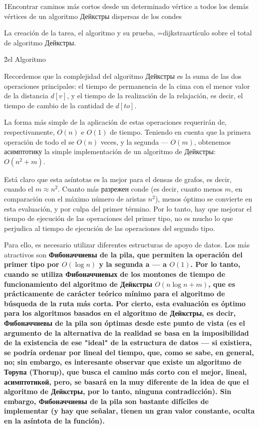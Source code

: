 \h1{Encontrar caminos más cortos desde un determinado vértice a todos los demás vértices de un algoritmo Дейкстры dispersas de los condes}

La creación de la tarea, el algoritmo y su prueba, \algohref=dijkstra{artículo sobre el total de algoritmo Дейкстры}.

\h2{el Algoritmo}

Recordemos que la complejidad del algoritmo Дейкстры es la suma de las dos operaciones principales: el tiempo de permanencia de la cima con el menor valor de la distancia $d[v]$, y el tiempo de la realización de la relajación, es decir, el tiempo de cambio de la cantidad de $d[to]$.

La forma más simple de la aplicación de estas operaciones requerirán de, respectivamente, $O(n)$ e $O(1)$ de tiempo. Teniendo en cuenta que la primera operación de todo el se $O(n)$ veces, y la segunda --- $O(m)$, obtenemos асимптотику la simple implementación de un algoritmo de Дейкстры: $O(n^2+m)$.

Está claro que esta asíntotas es la mejor para el densas de grafos, es decir, cuando el $m \approx n^2$. Cuanto más разрежен conde (es decir, cuanto menos $m$, en comparación con el máximo número de aristas $n^2$), menos óptimo se convierte en esta evaluación, y por culpa del primer término. Por lo tanto, hay que mejorar el tiempo de ejecución de las operaciones del primer tipo, no es mucho lo que perjudica al tiempo de ejecución de las operaciones del segundo tipo.

Para ello, es necesario utilizar diferentes estructuras de apoyo de datos. Los más atractivos son \bf{Фибоначчиевы de la pila}, que permiten la operación del primer tipo por $O(\log n)$ y la segunda a --- a $O(1)$. Por lo tanto, cuando se utiliza Фибоначчиевых de los montones de tiempo de funcionamiento del algoritmo de Дейкстры $O(n \log n + m)$, que es prácticamente de carácter teórico mínimo para el algoritmo de búsqueda de la ruta más corta. Por cierto, esta evaluación es óptimo para los algoritmos basados en el algoritmo de Дейкстры, es decir, Фибоначчиевы de la pila son óptimas desde este punto de vista (es el argumento de la alternativa de la realidad se basa en la imposibilidad de la existencia de ese "ideal" de la estructura de datos --- si existiera, se podría ordenar por lineal del tiempo, que, como se sabe, en general, no; sin embargo, es interesante observar que existe un algoritmo de Торупа (Thorup), que busca el camino más corto con el mejor, lineal, асимптотикой, pero, se basará en la muy diferente de la idea de que el algoritmo de Дейкстры, por lo tanto, ninguna contradicción). Sin embargo, Фибоначчиевы de la pila son bastante difíciles de implementar (y hay que señalar, tienen un gran valor constante, oculta en la asíntota de la función).

